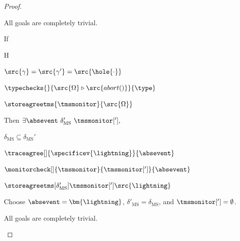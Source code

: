 \documentclass[a4paper,names,dvipsnames]{article}
\begin{document}
\begin{proof}
\begin{description}
      All goals are completely trivial.

      If
      \begin{passumptions}{H}
        \item $\src{\gamma}=\src{\gamma'}=\src{\hole{\cdot}}$
        \item $\typechecks{}{\src{\Omega}\triangleright\src{abort()}}{\type}$
        \item $\storeagreetms{\tmsmonitor}{\src{\Omega}}$
      \end{passumptions}
      Then $\exists \absevent\ \delta_{\text{MS}}'\ \tmsmonitor['],$
      \begin{goals}
        \item $\delta_{\text{MS}}\subseteq\delta_{\text{MS}}'$
        \item $\traceagree[]{\specificev{\lightning}}{\absevent}$
        \item $\monitorcheck[]{\tmsmonitor}{\tmsmonitor[']}{\absevent}$
        \item $\storeagreetms[\delta_{\text{MS}}']{\tmsmonitor[']}{\src{\lightning}}$
      \end{goals}
      Choose $\absevent=\bm{\lightning}$, $\delta'_{\text{MS}}=\delta_{\text{MS}}$, and $\tmsmonitor[']=\emptyset$.

      All goals are completely trivial.


\end{description}
\end{proof}
\end{document}
